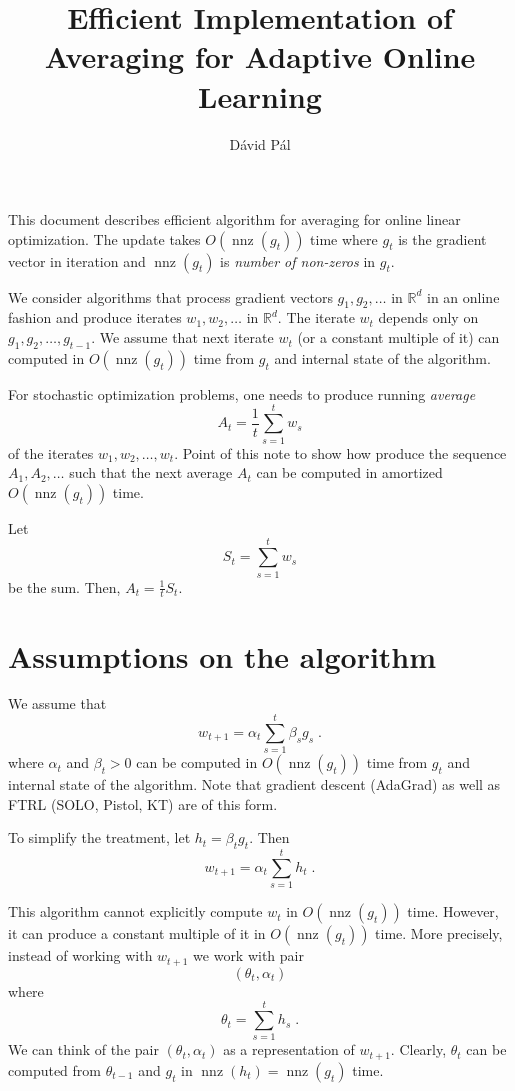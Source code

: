 \documentclass{article}
\newcommand{\R}{\mathbb{R}}
\DeclareMathOperator*{\nnz}{nnz}
\begin{document}
\title{Efficient Implementation of Averaging for Adaptive Online Learning}
\author{D\'avid P\'al}
\maketitle

This document describes efficient algorithm for averaging for online linear
optimization. The update takes $O(\nnz(g_t))$ time where $g_t$ is the gradient
vector in iteration and $\nnz(g_t)$ is \emph{number of non-zeros} in $g_t$.

We consider algorithms that process gradient vectors $g_1, g_2, \dots$ in
$\R^d$ in an online fashion and produce iterates $w_1, w_2, \dots$ in $\R^d$.
The iterate $w_t$ depends only on $g_1, g_2, \dots, g_{t-1}$.  We assume that
next iterate $w_t$ (or a constant multiple of it) can computed in
$O(\nnz(g_t))$ time from $g_t$ and internal state of the algorithm.

For stochastic optimization problems, one needs to produce running \emph{average}
$$
A_t = \frac{1}{t} \sum_{s=1}^t w_s
$$
of the iterates $w_1, w_2, \dots, w_t$. Point of this note to show
how produce the sequence $A_1, A_2, \dots$ such that the next average $A_t$
can be computed in amortized $O(\nnz(g_t))$ time.

Let
$$
S_t = \sum_{s=1}^t w_s
$$
be the sum. Then, $A_t = \frac{1}{t} S_t$.

\section{Assumptions on the algorithm}

We assume that
$$
w_{t+1} = \alpha_t \sum_{s=1}^t \beta_s g_s \; .
$$
where $\alpha_t$ and $\beta_t > 0$ can be computed in $O(\nnz(g_t))$ time
from $g_t$ and internal state of the algorithm.  Note that gradient descent
(AdaGrad) as well as FTRL (SOLO, Pistol, KT) are of this form.

To simplify the treatment, let $h_t = \beta_t g_t$. Then
$$
w_{t+1} = \alpha_t \sum_{s=1}^t h_t \; .
$$

This algorithm cannot explicitly compute $w_t$ in $O(\nnz(g_t))$ time.
However, it can produce a constant multiple of it in $O(\nnz(g_t))$ time.
More precisely, instead of working with $w_{t+1}$ we work with pair
$$
(\theta_t, \alpha_t)
$$
where
$$
\theta_t = \sum_{s=1}^t h_s \; .
$$
We can think of the pair $(\theta_t, \alpha_t)$ as a representation of $w_{t+1}$.
Clearly, $\theta_t$ can be computed from $\theta_{t-1}$ and $g_t$ in $\nnz(h_t)
= \nnz(g_t)$ time.
\end{document}
